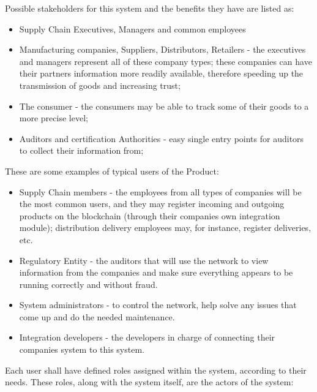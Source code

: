 	 Possible stakeholders for this system and the benefits they have are listed as:
    \begin{itemize}
		\item Supply Chain Executives, Managers and common employees
			\item Manufacturing companies, Suppliers, Distributors, Retailers - the executives and managers represent all of these company types; these companies can have their partners information more readily available, therefore speeding up the transmission of goods and increasing trust;
		\item The consumer - the consumers may be able to track some of their goods to a more precise level;
		\item Auditors and certification Authorities - easy single entry points for auditors to collect their information from;
	\end{itemize}
	These are some examples of typical users of the Product:
	\begin{itemize}
		\item Supply Chain members - the employees from all types of companies will be the most common users, and they may register incoming and outgoing products on the blockchain (through their companies own integration module); distribution delivery employees may, for instance, register deliveries, etc.
		\item Regulatory Entity - the auditors that will use the network to view information from the companies and make sure everything appears to be running correctly and without fraud.
		\item System administrators - to control the network, help solve any issues that come up and do the needed maintenance.
		\item Integration developers - the developers in charge of connecting their companies system to this system.
	\end{itemize}
	Each user shall have defined roles assigned within the system, according to their needs. These roles, along with the system itself, are the actors of the system:
